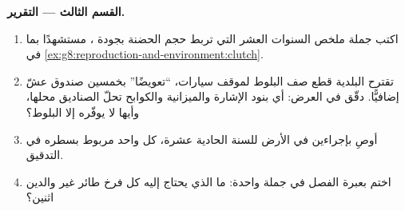 \begin{problem}
\medskip\noindent\textbf{القسم الثالث --- التقرير.}
\begin{enumerate}[resume]
  \item اكتب جملة ملخص السنوات العشر التي تربط حجم الحضنة بجودة
        ، مستشهدًا بما في
        \cref{ex:g8:reproduction-and-environment:clutch}.
  \item تقترح البلدية قطع صف البلوط لموقف سيارات، ``تعويضًا''
        بخمسين صندوق عشّ إضافيًّا. دقّق في العرض: أي بنود الإشارة
        والميزانية والكوابح  تحلّ الصناديق محلها، وأيها
        لا يوفّره إلا البلوط؟
  \item أوصِ بإجراءين في الأرض للسنة الحادية عشرة، كل واحد
        مربوط بسطره في التدقيق.
  \item اختم بعبرة الفصل في جملة واحدة: ما الذي يحتاج إليه كل
        فرخ طائر غير والدين اثنين؟
\end{enumerate}
\end{problem}
